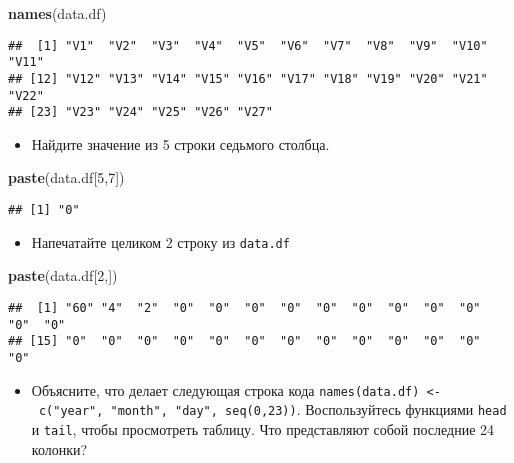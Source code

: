 \documentclass[]{article}
\newenvironment{Shaded}{\begin{snugshade}}{\end{snugshade}}
\newcommand{\KeywordTok}[1]{\textcolor[rgb]{0.13,0.29,0.53}{\textbf{#1}}}
\newcommand{\DecValTok}[1]{\textcolor[rgb]{0.00,0.00,0.81}{#1}}
\newcommand{\NormalTok}[1]{#1}
\providecommand{\tightlist}{%
  \setlength{\itemsep}{0pt}\setlength{\parskip}{0pt}}
\begin{document}
\begin{Shaded}
\begin{Highlighting}[]
\KeywordTok{names}\NormalTok{(data.df)}
\end{Highlighting}
\end{Shaded}

\begin{verbatim}
##  [1] "V1"  "V2"  "V3"  "V4"  "V5"  "V6"  "V7"  "V8"  "V9"  "V10" "V11"
## [12] "V12" "V13" "V14" "V15" "V16" "V17" "V18" "V19" "V20" "V21" "V22"
## [23] "V23" "V24" "V25" "V26" "V27"
\end{verbatim}

\begin{itemize}
\tightlist
\item
  Найдите значение из 5 строки седьмого столбца.
\end{itemize}

\begin{Shaded}
\begin{Highlighting}[]
\KeywordTok{paste}\NormalTok{(data.df[}\DecValTok{5}\NormalTok{,}\DecValTok{7}\NormalTok{])}
\end{Highlighting}
\end{Shaded}

\begin{verbatim}
## [1] "0"
\end{verbatim}

\begin{itemize}
\tightlist
\item
  Напечатайте целиком 2 строку из \texttt{data.df}
\end{itemize}

\begin{Shaded}
\begin{Highlighting}[]
\KeywordTok{paste}\NormalTok{(data.df[}\DecValTok{2}\NormalTok{,])}
\end{Highlighting}
\end{Shaded}

\begin{verbatim}
##  [1] "60" "4"  "2"  "0"  "0"  "0"  "0"  "0"  "0"  "0"  "0"  "0"  "0"  "0" 
## [15] "0"  "0"  "0"  "0"  "0"  "0"  "0"  "0"  "0"  "0"  "0"  "0"  "0"
\end{verbatim}

\begin{itemize}
\tightlist
\item
  Объясните, что делает следующая строка кода
  \texttt{names(data.df)\ \textless{}-\ c("year",\ "month",\ "day",\ seq(0,23))}.
  Воспользуйтесь функциями \texttt{head} и \texttt{tail}, чтобы
  просмотреть таблицу. Что представляют собой последние 24 колонки?
\end{itemize}
\end{document}
